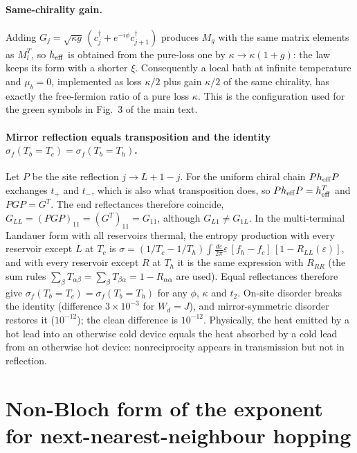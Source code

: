 \documentclass[aps,prl,superscriptaddress,nofootinbib,onecolumn,notitlepage,11pt]{revtex4-2}
\newcommand{\heff}{h_{\rm eff}}
\begin{document}
\paragraph{Same-chirality gain.}
Adding $G_j=\sqrt{\kappa g}\,(c_j^\dagger+e^{-i\phi}c_{j+1}^\dagger)$ produces $M_g$ with the same matrix elements as $M_l^{T}$, so $\heff$ is obtained from the pure-loss one by $\kappa\to\kappa(1+g)$: the law keeps its form with a shorter $\xi$. Consequently a local bath at infinite temperature and $\mu_b=0$, implemented as loss $\kappa/2$ plus gain $\kappa/2$ of the same chirality, has exactly the free-fermion ratio of a pure loss $\kappa$. This is the configuration used for the green symbols in Fig.~3 of the main text.

\paragraph{Mirror reflection equals transposition and the identity $\sigma_f(T_b=T_c)=\sigma_f(T_b=T_h)$.}
Let $P$ be the site reflection $j\to L+1-j$. For the uniform chiral chain $P\heff P$ exchanges $t_+$ and $t_-$, which is also what transposition does, so $P\heff P=\heff^{T}$ and $P G P=G^{T}$. The end reflectances therefore coincide, $G_{LL}=(PGP)_{11}=(G^{T})_{11}=G_{11}$, although $G_{L1}\neq G_{1L}$. In the multi-terminal Landauer form with all reservoirs thermal, the entropy production with every reservoir except $L$ at $T_c$ is $\sigma=(1/T_c-1/T_h)\int\frac{d\varepsilon}{2\pi}\varepsilon\,[f_h-f_c]\,[1-R_{LL}(\varepsilon)]$, and with every reservoir except $R$ at $T_h$ it is the same expression with $R_{RR}$ (the sum rules $\sum_\beta T_{\alpha\beta}=\sum_\beta T_{\beta\alpha}=1-R_{\alpha\alpha}$ are used). Equal reflectances therefore give $\sigma_f(T_b=T_c)=\sigma_f(T_b=T_h)$ for any $\phi$, $\kappa$ and $t_2$. On-site disorder breaks the identity (difference $3\times10^{-3}$ for $W_d=J$), and mirror-symmetric disorder restores it ($10^{-12}$); the clean difference is $10^{-12}$. Physically, the heat emitted by a hot lead into an otherwise cold device equals the heat absorbed by a cold lead from an otherwise hot device: nonreciprocity appears in transmission but not in reflection.

\section{Non-Bloch form of the exponent for next-nearest-neighbour hopping}
\label{sec:nonbloch}
\end{document}
